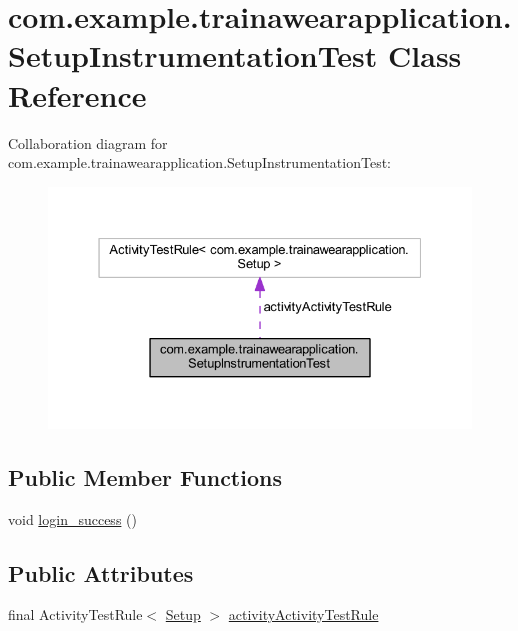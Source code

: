 \hypertarget{classcom_1_1example_1_1trainawearapplication_1_1_setup_instrumentation_test}{}\section{com.\+example.\+trainawearapplication.\+Setup\+Instrumentation\+Test Class Reference}
\label{classcom_1_1example_1_1trainawearapplication_1_1_setup_instrumentation_test}


Collaboration diagram for com.\+example.\+trainawearapplication.\+Setup\+Instrumentation\+Test\+:
\nopagebreak
\begin{figure}[H]
\begin{center}
\leavevmode
\includegraphics[width=331pt]{classcom_1_1example_1_1trainawearapplication_1_1_setup_instrumentation_test__coll__graph}
\end{center}
\end{figure}
\subsection*{Public Member Functions}
\begin{DoxyCompactItemize}
\item 
void \mbox{\hyperlink{classcom_1_1example_1_1trainawearapplication_1_1_setup_instrumentation_test_a4dbc2cfc0d101616f6c60f075bc55d58}{login\+\_\+success}} ()
\end{DoxyCompactItemize}
\subsection*{Public Attributes}
\begin{DoxyCompactItemize}
\item 
final Activity\+Test\+Rule$<$ \mbox{\hyperlink{classcom_1_1example_1_1trainawearapplication_1_1_setup}{Setup}} $>$ \mbox{\hyperlink{classcom_1_1example_1_1trainawearapplication_1_1_setup_instrumentation_test_ac9f8d1c61d6707efca17625aa2c3ca28}{activity\+Activity\+Test\+Rule}}
\end{DoxyCompactItemize}

